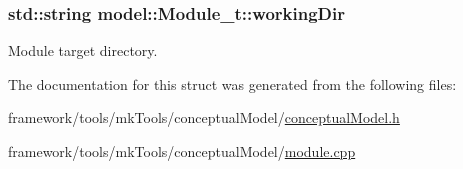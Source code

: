 \subsubsection[{\texorpdfstring{working\+Dir}{workingDir}}]{\setlength{\rightskip}{0pt plus 5cm}std\+::string model\+::\+Module\+\_\+t\+::working\+Dir}\hypertarget{structmodel_1_1_module__t_afce6d4b8ed770d2dbf94f7917965c91d}{}\label{structmodel_1_1_module__t_afce6d4b8ed770d2dbf94f7917965c91d}


Module target directory. 



The documentation for this struct was generated from the following files\+:\begin{DoxyCompactItemize}
\item 
framework/tools/mk\+Tools/conceptual\+Model/\hyperlink{conceptual_model_8h}{conceptual\+Model.\+h}\item 
framework/tools/mk\+Tools/conceptual\+Model/\hyperlink{module_8cpp}{module.\+cpp}\end{DoxyCompactItemize}
